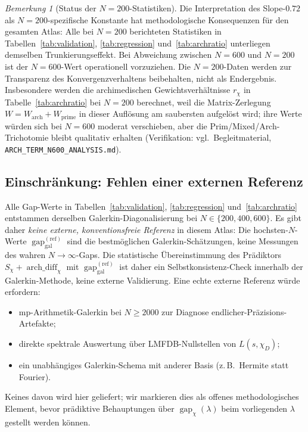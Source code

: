\documentclass[10pt,twocolumn]{article}
\theoremstyle{definition}
\theoremstyle{remark}
\newtheorem{remark}[theorem]{Bemerkung}
\newcommand{\gap}{\operatorname{gap}}
\newcommand{\chifn}{\chi}
\newcommand{\archdiff}{\operatorname{arch\_diff}}
\begin{document}
\begin{remark}[Status der $N=200$-Statistiken]
\label{rem:n200-status}
Die Interpretation des Slope-$0.72$ als $N=200$-spezifische Konstante
hat methodologische Konsequenzen für den gesamten Atlas: Alle bei $N=200$
berichteten Statistiken in Tabellen~\ref{tab:validation},
\ref{tab:regression} und~\ref{tab:archratio} unterliegen demselben
Trunkierungseffekt. Bei Abweichung zwischen $N=600$ und $N=200$ ist der
$N=600$-Wert operationell vorzuziehen. Die $N=200$-Daten werden zur
Transparenz des Konvergenzverhaltens beibehalten, nicht als Endergebnis.
Insbesondere werden die archimedischen Gewichtsverhältnisse $r_\chi$
in Tabelle~\ref{tab:archratio} bei $N=200$ berechnet, weil die
Matrix-Zerlegung $W=W_{\mathrm{arch}}+W_{\mathrm{prime}}$ in dieser
Auflösung am saubersten aufgelöst wird; ihre Werte würden sich bei
$N=600$ moderat verschieben, aber die Prim/Mixed/Arch-Trichotomie
bleibt qualitativ erhalten (Verifikation: vgl.\ Begleitmaterial,
\texttt{ARCH\_TERM\_N600\_ANALYSIS.md}).
\end{remark}

\subsection{Einschränkung: Fehlen einer externen Referenz}
\label{sec:limitation-external}

Alle Gap-Werte in Tabellen~\ref{tab:validation}, \ref{tab:regression}
und~\ref{tab:archratio} entstammen derselben Galerkin-Diagonalisierung
bei $N\in\{200,400,600\}$. Es gibt daher \emph{keine externe,
konventionsfreie Referenz} in diesem Atlas: Die hochsten-$N$-Werte
$\gap_{\mathrm{gal}}^{(\mathrm{ref})}$ sind die bestmöglichen
Galerkin-Schätzungen, keine Messungen des wahren $N\to\infty$-Gaps.
Die statistische Übereinstimmung des Prädiktors $S_\chi+\archdiff_\chi$
mit $\gap_{\mathrm{gal}}^{(\mathrm{ref})}$ ist daher ein
Selbstkonsistenz-Check innerhalb der Galerkin-Methode, keine externe
Validierung. Eine echte externe Referenz würde erfordern:
\begin{itemize}
\item[(i)] mp-Arithmetik-Galerkin bei $N\geq 2000$ zur Diagnose
  endlicher-Präzisions-Artefakte;
\item[(ii)] direkte spektrale Auswertung über LMFDB-Nullstellen von
  $L(s,\chi_D)$;
\item[(iii)] ein unabhängiges Galerkin-Schema mit anderer Basis (z.\,B.\
  Hermite statt Fourier).
\end{itemize}
Keines davon wird hier geliefert; wir markieren dies als offenes
methodologisches Element, bevor prädiktive Behauptungen über
$\gap_{\chifn}(\lambda)$ beim vorliegenden $\lambda$ gestellt werden
können.
\end{document}
